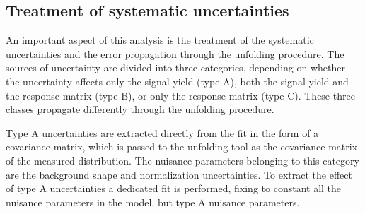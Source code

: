 \subsection{Treatment of systematic uncertainties}

An important aspect of this analysis is the treatment of the systematic
uncertainties and the error propagation through the unfolding procedure.
The sources of uncertainty are divided into three categories, depending
on whether the uncertainty affects only the signal yield (type A), both the signal
yield and the response matrix (type B), or only the response matrix (type C).
These three classes propagate differently through the unfolding procedure.

Type A uncertainties are extracted directly from the fit in the form of a covariance
matrix, which is passed to the unfolding tool as the covariance
matrix of the measured distribution. The nuisance parameters belonging to this category
are the background shape and normalization uncertainties.
To extract the effect of type A uncertainties a dedicated fit is performed,
fixing to constant all the nuisance parameters in the model, but type A nuisance parameters.


